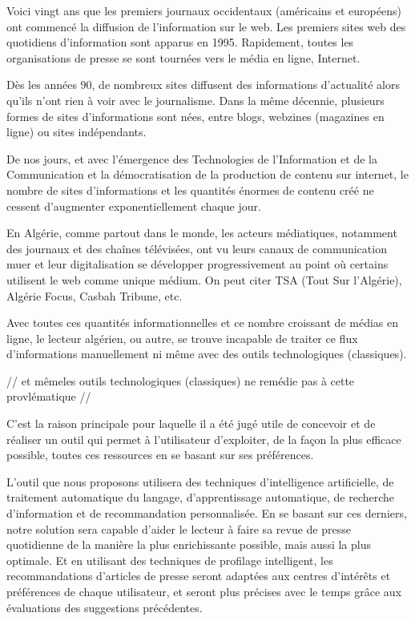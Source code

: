 
\newpage

Voici vingt ans que les premiers journaux occidentaux (américains et européens) ont commencé la diffusion de l'information sur le web. Les premiers sites web des quotidiens d'information sont apparus en 1995. Rapidement, toutes les organisations de presse se sont tournées vers le média en ligne, Internet.

Dès les années 90, de nombreux sites diffusent des informations d'actualité alors qu'ils n'ont rien à voir avec le journalisme. Dans la même décennie, plusieurs formes de sites d'informations sont nées, entre blogs, webzines (magazines en ligne) ou sites indépendants.

De nos jours, et avec l'émergence des Technologies de l'Information et de la Communication et la démocratisation de la production de contenu sur internet, le nombre de sites d'informations et les quantités énormes de contenu créé ne cessent d'augmenter exponentiellement chaque jour.

En Algérie, comme partout dans le monde, les acteurs médiatiques, notamment des journaux et des chaînes télévisées, ont vu leurs canaux de communication muer et leur digitalisation se développer progressivement au point où certains utilisent le web comme unique médium. On peut citer TSA (Tout Sur l'Algérie), Algérie Focus, Casbah Tribune, etc.

Avec toutes ces quantités informationnelles et ce nombre croissant de médias en ligne, le lecteur algérien, ou autre, se trouve incapable de traiter ce flux d'informations manuellement ni même avec des outils technologiques (classiques). 

// et mêmeles outils technologiques (classiques) ne remédie pas à cette provlématique //

C'est la raison principale pour laquelle il a été jugé utile de concevoir et de réaliser un outil qui permet à l'utilisateur d'exploiter, de la façon la plus efficace possible, toutes ces ressources en se basant sur ses préférences.

L'outil que nous proposons utilisera des techniques d'intelligence artificielle, de traitement automatique du langage, d'apprentissage automatique, de recherche d'information et de recommandation personnalisée. En se basant sur ces derniers, notre solution sera capable d'aider le lecteur à faire sa revue de presse quotidienne de la manière la plus enrichissante possible, mais aussi la plus optimale. Et en utilisant des techniques de profilage intelligent, les recommandations d'articles de presse seront adaptées aux centres d'intérêts et préférences de chaque utilisateur, et seront plus précises avec le temps grâce aux évaluations des suggestions précédentes.

